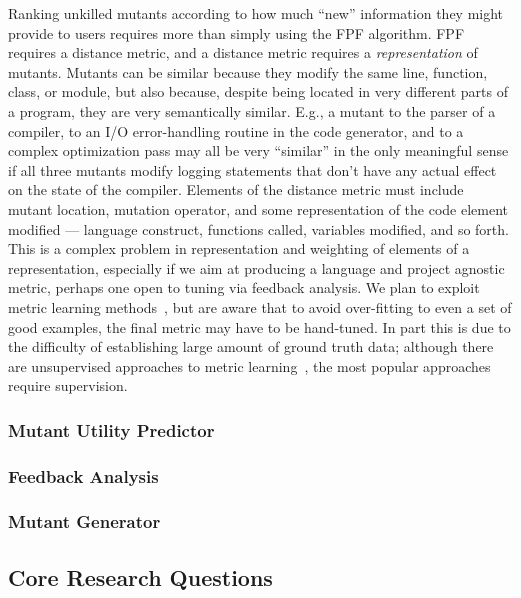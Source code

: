 Ranking unkilled mutants according to how much ``new'' information they might
provide to users requires more than simply using the FPF algorithm.
FPF requires a distance metric, and a distance metric requires a
\emph{representation} of mutants.  Mutants can be similar because they
modify the same line, function, class, or module, but also because,
despite being located in very different parts of a program, they are
very semantically similar.  E.g., a mutant to the parser of a compiler, to
an I/O error-handling routine in the code generator, and to a complex
optimization pass may all be very ``similar'' in the only meaningful
sense if all three mutants modify logging statements that don't have
any actual effect on the state of the compiler.  Elements of the
distance metric must include mutant location, mutation operator, and
some representation of the code element modified --- language
construct, functions called, variables modified, and so forth.  This
is a complex problem in representation and weighting of elements of a
representation, especially if we aim at producing a language and
project agnostic metric, perhaps one open to tuning via feedback
analysis.  We plan to exploit metric learning
methods~\cite{kulis2012metric}, but are aware that to avoid over-fitting
to even a set of good examples, the final metric may have to be
hand-tuned.  In part this is due to the difficulty of establishing
large amount of ground truth data; although there are unsupervised
approaches to metric learning~\cite{scholkopf1998nonlinear,tipping1999probabilistic}, the most popular approaches require supervision.

\subsubsection{Mutant Utility Predictor}

\subsubsection{Feedback Analysis}

\subsubsection{Mutant Generator}

\subsection{Core Research Questions}


